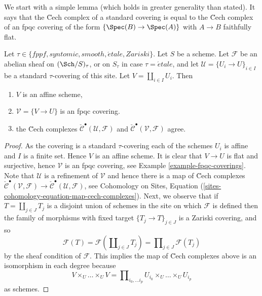 \noindent
We start with a simple lemma (which holds in greater generality than
stated). It says that the \u Cech complex of a standard covering is
equal to the \u Cech complex of an fpqc covering of the form
$\{\Spec(B) \to \Spec(A)\}$ with $A \to B$ faithfully flat.

\begin{lemma}
\label{lemma-cech-complex}
Let $\tau \in \{fppf, syntomic, smooth, \acute{e}tale, Zariski\}$.
Let $S$ be a scheme.
Let $\mathcal{F}$ be an abelian sheaf on $(\Sch/S)_\tau$, or on
$S_\tau$ in case $\tau = \acute{e}tale$, and let
$\mathcal{U} = \{U_i \to U\}_{i \in I}$
be a standard $\tau$-covering of this site.
Let $V = \coprod_{i \in I} U_i$. Then
\begin{enumerate}
\item $V$ is an affine scheme,
\item $\mathcal{V} = \{V \to U\}$ is an fpqc covering.
\item the \u Cech complexes
$\check{\mathcal{C}}^\bullet (\mathcal{U}, \mathcal{F})$ and
$\check{\mathcal{C}}^\bullet (\mathcal{V}, \mathcal{F})$ agree.
\end{enumerate}
\end{lemma}

\begin{proof}
As the covering is a standard $\tau$-covering each of the schemes
$U_i$ is affine and $I$ is a finite set. Hence $V$ is an affine scheme.
It is clear that $V \to U$ is flat and surjective, hence
$\mathcal{V}$ is an fpqc covering, see
Example \ref{example-fpqc-coverings}.
Note that $\mathcal{U}$ is a refinement of $\mathcal{V}$
and hence there is a map of \u Cech complexes
$\check{\mathcal{C}}^\bullet (\mathcal{V}, \mathcal{F}) \to
\check{\mathcal{C}}^\bullet (\mathcal{U}, \mathcal{F})$, see
Cohomology on Sites,
Equation (\ref{sites-cohomology-equation-map-cech-complexes}).
Next, we observe that if $T = \coprod_{j \in J} T_j$ is a
disjoint union of schemes in the site on which $\mathcal{F}$ is defined
then the family of morphisms with fixed target
$\{T_j \to T\}_{j \in J}$ is a Zariski covering, and so
\begin{equation}
\label{equation-sheaf-coprod}
\mathcal{F}(T) =
\mathcal{F}(\coprod\nolimits_{j \in J} T_j) =
\prod\nolimits_{j \in J} \mathcal{F}(T_j)
\end{equation}
by the sheaf condition of $\mathcal{F}$.
This implies the map of \u Cech complexes above is an isomorphism
in each degree because
$$
V \times_U \ldots \times_U V
=
\prod\nolimits_{i_0, \ldots i_p} U_{i_0} \times_U \ldots \times_U U_{i_p}
$$
as schemes.
\end{proof}

